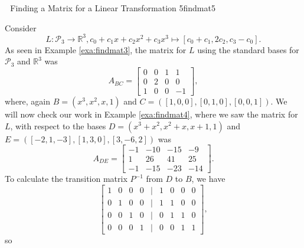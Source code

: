         \begin{example}{\Difficulty\,\Difficulty\,\Difficulty\,\,Finding a Matrix for a Linear Transformation 5}{findmat5}
            
            Consider
            \begin{equation*}
                L:\mathcal{P}_3\to\mathbb{R}^3, c_0+c_1x+c_2x^2+c_3x^3\mapsto[c_0+c_1,2c_2,c_3-c_0].
            \end{equation*}
            As seen in Example \ref{exa:findmat3}, the matrix for \(L\) using the standard bases for \(\mathcal{P_3}\) and \(\mathbb{R}^3\) was
            \begin{equation*}
                A_{BC}=\begin{bmatrix}
                    0 & 0 & 1 & 1 \\
                    0 & 2 & 0 & 0 \\
                    1 & 0 & 0 & -1
                \end{bmatrix},
            \end{equation*}
            where, again \(B=(x^3,x^2,x,1)\) and \(C=([1,0,0],[0,1,0],[0,0,1])\). We will now check our work in Example \ref{exa:findmat4}, where we saw the matrix for \(L\), with respect to the bases \(D=(x^3+x^2,x^2+x,x+1,1)\) and \(E=([-2,1,-3],[1,3,0],[3,-6,2])\) was
            \begin{equation*}
                A_{DE}=\begin{bmatrix}
                    -1 & -10 & -15 & -9 \\
                    1 & 26 & 41 & 25 \\
                    -1 & -15 & -23 & -14
                \end{bmatrix}.
            \end{equation*}
            To calculate the transition matrix \(P^{-1}\) from \(D\) to \(B\), we have
            \begin{equation*}
                \begin{bmatrix}
                    1 & 0 & 0 & 0 & | & 1 & 0 & 0 & 0 \\
                    0 & 1 & 0 & 0 & | & 1 & 1 & 0 & 0 \\
                    0 & 0 & 1 & 0 & | & 0 & 1 & 1 & 0 \\
                    0 & 0 & 0 & 1 & | & 0 & 0 & 1 & 1
                \end{bmatrix},
            \end{equation*}
            so
            \begin{equation*}

\end{equation*}
\end{example}
